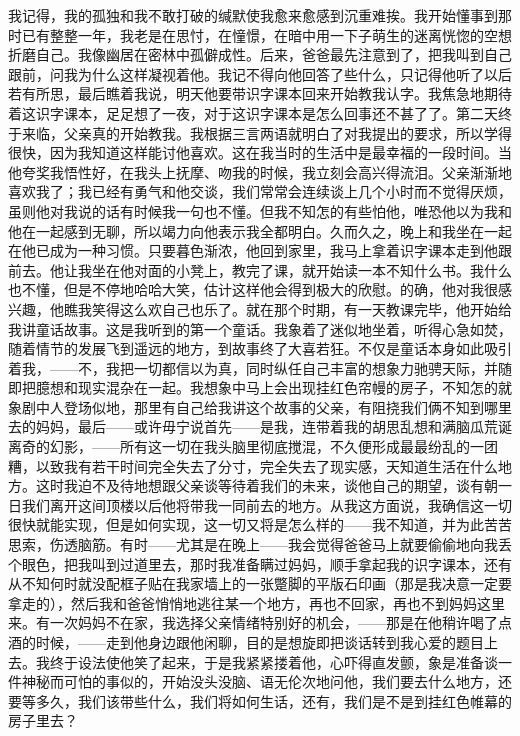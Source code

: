 \documentclass[12pt, UTF8]{ctexbook}
\begin{document}
\par 我记得，我的孤独和我不敢打破的缄默使我愈来愈感到沉重难挨。我开始懂事到那时已有整整一年，我老是在思忖，在憧憬，在暗中用一下子萌生的迷离恍惚的空想折磨自己。我像幽居在密林中孤僻成性。后来，爸爸最先注意到了，把我叫到自己跟前，问我为什么这样凝视着他。我记不得向他回答了些什么，只记得他听了以后若有所思，最后瞧着我说，明天他要带识字课本回来开始教我认字。我焦急地期待着这识字课本，足足想了一夜，对于这识字课本是怎么回事还不甚了了。第二天终于来临，父亲真的开始教我。我根据三言两语就明白了对我提出的要求，所以学得很快，因为我知道这样能讨他喜欢。这在我当时的生活中是最幸福的一段时间。当他夸奖我悟性好，在我头上抚摩、吻我的时候，我立刻会高兴得流泪。父亲渐渐地喜欢我了；我已经有勇气和他交谈，我们常常会连续谈上几个小时而不觉得厌烦，虽则他对我说的话有时候我一句也不懂。但我不知怎的有些怕他，唯恐他以为我和他在一起感到无聊，所以竭力向他表示我全都明白。久而久之，晚上和我坐在一起在他已成为一种习惯。只要暮色渐浓，他回到家里，我马上拿着识字课本走到他跟前去。他让我坐在他对面的小凳上，教完了课，就开始读一本不知什么书。我什么也不懂，但是不停地哈哈大笑，估计这样他会得到极大的欣慰。的确，他对我很感兴趣，他瞧我笑得这么欢自己也乐了。就在那个时期，有一天教课完毕，他开始给我讲童话故事。这是我听到的第一个童话。我象着了迷似地坐着，听得心急如焚，随着情节的发展飞到遥远的地方，到故事终了大喜若狂。不仅是童话本身如此吸引着我，——不，我把一切都信以为真，同时纵任自己丰富的想象力驰骋天际，并随即把臆想和现实混杂在一起。我想象中马上会出现挂红色帘幔的房子，不知怎的就象剧中人登场似地，那里有自己给我讲这个故事的父亲，有阻挠我们俩不知到哪里去的妈妈，最后——或许毋宁说首先——是我，连带着我的胡思乱想和满脑瓜荒诞离奇的幻影，——所有这一切在我头脑里彻底搅混，不久便形成最最纷乱的一团糟，以致我有若干时间完全失去了分寸，完全失去了现实感，天知道生活在什么地方。这时我迫不及待地想跟父亲谈等待着我们的未来，谈他自己的期望，谈有朝一日我们离开这间顶楼以后他将带我一同前去的地方。从我这方面说，我确信这一切很快就能实现，但是如何实现，这一切又将是怎么样的——我不知道，并为此苦苦思索，伤透脑筋。有时——尤其是在晚上——我会觉得爸爸马上就要偷偷地向我丢个眼色，把我叫到过道里去，那时我准备瞒过妈妈，顺手拿起我的识字课本，还有从不知何时就没配框子贴在我家墙上的一张蹩脚的平版石印画（那是我决意一定要拿走的），然后我和爸爸悄悄地逃往某一个地方，再也不回家，再也不到妈妈这里来。有一次妈妈不在家，我选择父亲情绪特别好的机会，——那是在他稍许喝了点酒的时候，——走到他身边跟他闲聊，目的是想旋即把谈话转到我心爱的题目上去。我终于设法使他笑了起来，于是我紧紧搂着他，心吓得直发颤，象是准备谈一件神秘而可怕的事似的，开始没头没脑、语无伦次地问他，我们要去什么地方，还要等多久，我们该带些什么，我们将如何生话，还有，我们是不是到挂红色帷幕的房子里去？
\end{document}
